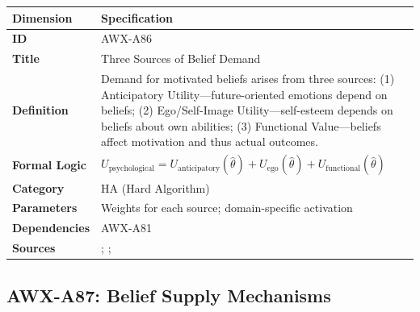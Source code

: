 \begin{table}[htbp]
\small
\begin{tabular}{p{3cm}p{11cm}}
\toprule
\textbf{Dimension} & \textbf{Specification} \\
\midrule
\textbf{ID} & AWX-A86 \\
\textbf{Title} & Three Sources of Belief Demand \\
\textbf{Definition} & Demand for motivated beliefs arises from three sources: (1) Anticipatory Utility---future-oriented emotions depend on beliefs; (2) Ego/Self-Image Utility---self-esteem depends on beliefs about own abilities; (3) Functional Value---beliefs affect motivation and thus actual outcomes. \\
\textbf{Formal Logic} & $U_{\text{psychological}} = U_{\text{anticipatory}}(\hat{\theta}) + U_{\text{ego}}(\hat{\theta}) + U_{\text{functional}}(\hat{\theta})$ \\
\textbf{Category} & HA (Hard Algorithm) \\
\textbf{Parameters} & Weights for each source; domain-specific activation \\
\textbf{Dependencies} & AWX-A81 \\
\textbf{Sources} & \citet{benabou2016mindful}; \citet{caplin2001psychological}; \citet{loewenstein1987anticipation} \\
\bottomrule
\end{tabular}
\end{table}


\subsection{AWX-A87: Belief Supply Mechanisms}

